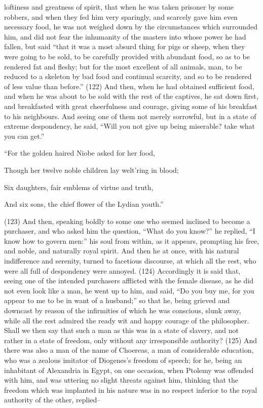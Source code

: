 loftiness and greatness of spirit, that when he was taken prisoner by some robbers, and when they
fed him very sparingly, and scarcely gave him even necessary food, he was not weighed down by
the circumstances which surrounded him, and did not fear the inhumanity of the masters into
whose power he had fallen, but said ``that it was a most absurd thing for pigs or sheep, when they
were going to be sold, to be carefully provided with abundant food, so as to be rendered fat and
fleshy; but for the most excellent of all animals, man, to be reduced to a skeleton by bad food and
continual scarcity, and so to be rendered of less value than before.'' (122) And then, when he had
obtained sufficient food, and when he was about to be sold with the rest of the captives, he sat
down first, and breakfasted with great cheerfulness and courage, giving some of his breakfast to
his neighbours. And seeing one of them not merely sorrowful, but in a state of extreme
despondency, he said, ``Will you not give up being miserable? take what you can get.''

``For the golden haired Niobe asked for her food,

Though her twelve noble children lay welt'ring in blood;

Six daughters, fair emblems of virtue and truth,

And six sons, the chief flower of the Lydian youth.''

(123) And then, speaking boldly to some one who seemed inclined to become a purchaser, and
who asked him the question, ``What do you know?'' he replied, ``I know how to govern men:'' his soul
from within, as it appears, prompting his free, and noble, and naturally royal spirit. And then he at
once, with his natural indifference and serenity, turned to facetious discourse, at which all the rest,
who were all full of despondency were annoyed. (124) Accordingly it is said that, seeing one of the
intended purchasers afflicted with the female disease, as he did not even look like a man, he went
up to him, and said, ``Do you buy me, for you appear to me to be in want of a husband;'' so that he,
being grieved and downcast by reason of the infirmities of which he was conscious, slunk away,
while all the rest admired the ready wit and happy courage of the philosopher. Shall we then say
that such a man as this was in a state of slavery, and not rather in a state of freedom, only without
any irresponsible authority? (125) And there was also a man of the name of Choereas, a man of
considerable education, who was a zealous imitator of Diogenes's freedom of speech; for he,
being an inhabitant of Alexandria in Egypt, on one occasion, when Ptolemy was offended with him,
and was uttering no slight threats against him, thinking that the freedom which was implanted in his
nature was in no respect inferior to the royal authority of the other, replied--

